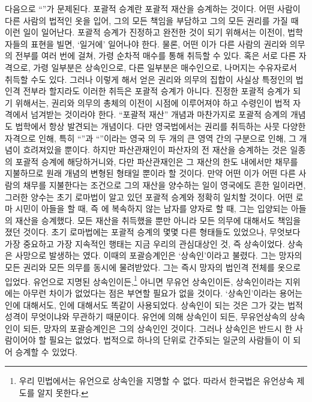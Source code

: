 다음으로 ``''가 문제된다.
포괄적 승계란 포괄적 재산을 승계하는 것이다.
어떤 사람이 다른 사람의 법적인 옷을 입어,
그의 모든 책임을 부담하고 그의 모든 권리를 가질 때 이런 일이 일어난다.
포괄적 승계가 진정하고 완전한 것이 되기 위해서는
이전이,
법학자들의 표현을 빌면, `일거에'
일어나야 한다.
물론, 어떤 이가 다른 사람의 권리와 의무의 전부를 여러 번에 걸쳐,
가령 순차적 매수를 통해 취득할 수 있다.
혹은 서로 다른 자격으로, 가령 일부분은 상속인으로,
다른 일부분은 매수인으로, 나머지는 수유자로서 취득할 수도 있다.
그러나 이렇게 해서 얻은 권리와 의무의 집합이 사실상 특정인의 법인격 전부라
할지라도 이러한 취득은 포괄적 승계가 아니다.
진정한 포괄적 승계가 되기 위해서는,
권리와 의무의 총체의 이전이  시점에 이루어져야 하고
수령인이  법적 자격에서 넘겨받는 것이라야 한다.
``포괄적 재산'' 개념과 마찬가지로 포괄적 승계의 개념도
법학에서 항상 발견되는 개념이다.
다만 영국법에서는 권리를 취득하는 사뭇 다양한 자격으로 인해,
특히 ``''과 ``''이라는
영국 의 두 개의 큰 영역 간의 구분으로 인해, 그 개념이 흐려져있을 뿐이다.
하지만 파산관재인이 파산자의 전 재산을 승계하는 것은
일종의 포괄적 승계에 해당하거니와,
다만
파산관재인은 그 재산의 한도 내에서만 채무를 지불하므로
원래 개념의 변형된 형태일 뿐이라 할 것이다.
만약 어떤 이가 어떤 다른 사람의  채무를 지불한다는 조건으로
그의  재산을 양수하는 일이 영국에도 흔한 일이라면,
그러한 양수는 초기 로마법이 알고 있던 포괄적 승계와 정확히 일치할 것이다.
어떤 로마 시민이 아들을
할 때,
즉 에 복속하지 않는 남자를 양자로 할 때,
그는 입양되는 아들의 재산을  승계했다.
모든 재산을 취득했을 뿐만 아니라 모든 의무에 대해서도 책임을 졌던 것이다.
초기 로마법에는 포괄적 승계의 몇몇 다른 형태들도 있었으나,
무엇보다 가장 중요하고 가장 지속적인 행태는 지금 우리의 관심대상인 것,
즉 상속이었다.
상속은 사망으로 발생하는 였다.
이때의 포괄승계인은 `상속인'이라고 불렸다.
그는 망자의 모든 권리와 모든 의무를 동시에 물려받았다.
그는 즉시 망자의 법인격 전체를 옷으로 입었다.
유언으로 지명된 상속인이든,\footnote{%
  우리 민법에서는 유언으로 상속인을 지명할 수 없다. 따라서
  한국법은 유언상속 제도를 알지 못한다.}
아니면
무유언 상속인이든, 상속인이라는 지위에는 아무런 차이가 없었다는 점은
부연할 필요가 없을 것이다.
`상속인'이라는 용어는 인에 대해서도, 인에 대해서도
똑같이 사용되었다.
상속인이 되는 것은 그가 갖는 법적 성격이 무엇이냐와
무관하기 때문이다.
유언에 의해 상속인이 되든, 무유언상속의 상속인이 되든,
망자의 포괄승계인은 그의 상속인인 것이다.
그러나 상속인은 반드시 한 사람이어야 할 필요는 없었다.
법적으로 하나의 단위로 간주되는 일군의 사람들이
이 되어 승계할 수 있었다.

